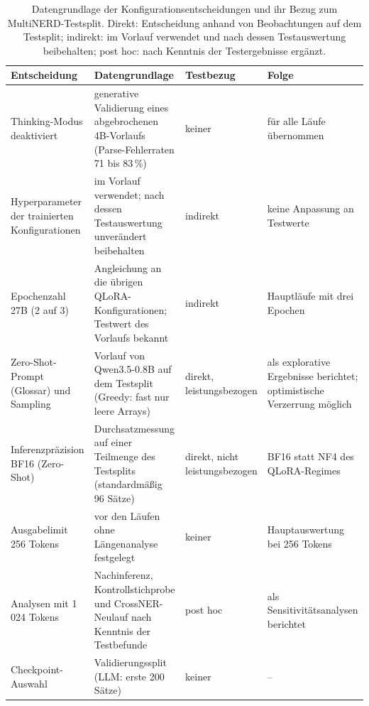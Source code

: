 \begin{table}[ht]
  \centering
  \small
  \caption[Datengrundlage der Konfigurationsentscheidungen]{Datengrundlage
  der Konfigurationsentscheidungen und ihr Bezug zum MultiNERD-Testsplit.
  Direkt: Entscheidung anhand von Beobachtungen auf dem Testsplit;
  indirekt: im Vorlauf verwendet und nach dessen Testauswertung
  beibehalten; post hoc: nach Kenntnis der Testergebnisse ergänzt.}
  \label{tab:datennutzung}
  \begin{tabularx}{\linewidth}{@{}>{\raggedright\arraybackslash}p{3.0cm}%
      >{\raggedright\arraybackslash}X%
      >{\raggedright\arraybackslash}p{2.9cm}%
      >{\raggedright\arraybackslash}p{3.3cm}@{}}
    \toprule
    \textbf{Entscheidung} & \textbf{Datengrundlage} & \textbf{Testbezug} &
    \textbf{Folge} \\
    \midrule
    Thinking-Modus deaktiviert & generative Validierung eines
      abgebrochenen 4B-Vorlaufs (Parse-Fehlerraten 71 bis 83\,\%) &
      keiner & für alle Läufe übernommen \\
    \addlinespace
    Hyperparameter der trainierten Konfigurationen & im Vorlauf
      verwendet; nach dessen Testauswertung unverändert beibehalten &
      indirekt & keine Anpassung an Testwerte \\
    \addlinespace
    Epochenzahl 27B (2 auf 3) & Angleichung an die übrigen
      QLoRA-Konfigurationen; Testwert des Vorlaufs bekannt & indirekt &
      Hauptläufe mit drei Epochen \\
    \addlinespace
    Zero-Shot-Prompt (Glossar) und Sampling & Vorlauf von Qwen3.5-0.8B
      auf dem Testsplit (Greedy: fast nur leere Arrays) & direkt,
      leistungsbezogen & als explorative Ergebnisse berichtet;
      optimistische Verzerrung möglich \\
    \addlinespace
    Inferenzpräzision BF16 (Zero-Shot) & Durchsatzmessung auf einer
      Teilmenge des Testsplits (standardmäßig 96 Sätze) & direkt, nicht
      leistungsbezogen & BF16 statt NF4 des QLoRA-Regimes \\
    \addlinespace
    Ausgabelimit 256 Tokens & vor den Läufen ohne Längenanalyse
      festgelegt & keiner & Hauptauswertung bei 256 Tokens \\
    \addlinespace
    Analysen mit 1\,024 Tokens & Nachinferenz, Kontrollstichprobe und
      CrossNER-Neulauf nach Kenntnis
      der Testbefunde & post hoc & als Sensitivitätsanalysen berichtet \\
    \addlinespace
    Checkpoint-Auswahl & Validierungssplit (LLM: erste 200 Sätze) &
      keiner & -- \\
    \bottomrule
  \end{tabularx}
\end{table}

